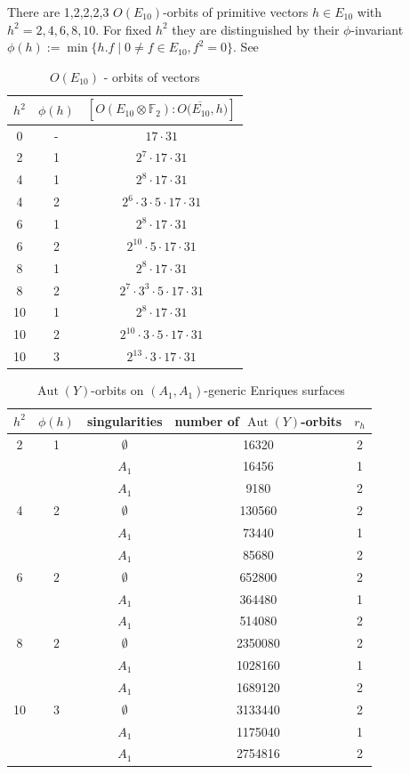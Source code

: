 \documentclass{amsart}
\theoremstyle{definition}
\theoremstyle{plain}
\DeclareMathOperator{\Aut}{Aut}
\newcommand{\FF}{\mathbb{F}}
\newcommand{\simon}[1]{\textcolor{magenta}{#1}}
\newcommand{\victor}[1]{\textcolor{red}{#1}}
\begin{document}
There are 1,2,2,2,3 $O(E_{10})$-orbits of primitive vectors $h\in E_{10}$ with $h^2 = 2,4,6,8,10$. For fixed $h^2$ they are distinguished by their $\phi$-invariant
$\phi(h):=\min \{h.f \mid 0\neq f\in E_{10}, f^2=0\}$. See  %


\begin{table}
\caption{$O(E_{10})$ - orbits of vectors}\label{table1}
\begin{tabular}{ccc}
\toprule
\(h^2\) & \(\phi(h)\) & \([O(E_{10}\otimes \FF_2): \overline{O(E_{10},h})]\)\\
\hline
0 & - &\( 17 \cdot 31\)\\
2 & 1 & \(2^7 \cdot 17  \cdot 31\)\\
4 & 1 & \(2^8\cdot 17\cdot 31\)\\
4 & 2 & \(2^6\cdot 3\cdot 5\cdot 17\cdot 31\)\\
6 & 1 & \(2^8\cdot 17\cdot 31\)\\
6 & 2 & \(2^{10}\cdot 5\cdot 17\cdot 31\)\\
8 & 1 & \(2^8\cdot 17\cdot 31\)\\
8 & 2 & \(2^7\cdot 3^3\cdot 5\cdot 17\cdot 31\)\\
10 & 1 & \(2^8\cdot 17\cdot 31\)\\
10 & 2 & \(2^{10}\cdot 3\cdot 5\cdot 17\cdot 31\)\\
10 & 3 & \(2^{13}\cdot 3\cdot 17\cdot 31\)\\
\bottomrule
\end{tabular}
\end{table}

\begin{table}
\caption{$\Aut(Y)$-orbits on $(A_1,A_1)$-generic Enriques surfaces}
\renewcommand{\arraystretch}{1.3}
 \begin{tabular}[t]{ccccc}
 \toprule
$h^2$ &$\phi(h)$&  singularities & number of $\Aut(Y)$-orbits & $r_h$ \\
\hline
2 &1 & $\emptyset$ &16320 & 2 \\
& & $A_1$ & 16456 & 1 \\
& & $A_1$ &9180& 2 \\
4 &2 & $\emptyset$ &130560 & 2 \\
& & $A_1$ & 73440 & 1 \\
& & $A_1$ &85680& 2 \\
 6 & $2$ & $\emptyset$ & 652800& 2 \\
& & $A_1$ &364480 & 1 \\
& & $A_1$ &514080 & 2 \\
 8 & $2$ & $\emptyset$ & 2350080 & 2 \\
& & $A_1$ & 1028160& 1 \\
&  & $A_1$ &  1689120 & 2 \\
 10 & $3$ & $\emptyset$ & 3133440& 2 \\
& & $A_1$ & 1175040 & 1 \\
& & $A_1$ & 2754816 & 2 \\
\bottomrule
\end{tabular}
\end{table}
\end{document}

